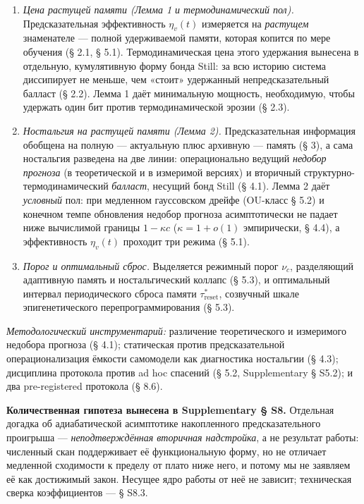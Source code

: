 \documentclass[pdflatex,sn-mathphys-ay]{sn-jnl}
\begin{document}
\begin{enumerate}

\def\labelenumi{\arabic{enumi}.}

\item

  \emph{Цена растущей памяти (Лемма 1 и термодинамический пол).} Предсказательная эффективность \(\eta_v(t)\) измеряется на \emph{растущем} знаменателе --- полной удерживаемой памяти, которая копится по мере обучения (§ 2.1, § 5.1). Термодинамическая цена этого удержания вынесена в отдельную, кумулятивную форму бонда Still: за всю историю система диссипирует не меньше, чем «стоит» удержанный непредсказательный балласт (§ 2.2). Лемма 1 даёт минимальную мощность, необходимую, чтобы удержать один бит против термодинамической эрозии (§ 2.3).

\item

  \emph{Ностальгия на растущей памяти (Лемма 2).} Предсказательная информация обобщена на полную --- актуальную плюс архивную --- память (§ 3), а сама ностальгия разведена на две линии: операционально ведущий \emph{недобор прогноза} (в теоретической и в измеримой версиях) и вторичный структурно-термодинамический \emph{балласт}, несущий бонд Still (§ 4.1). Лемма 2 даёт \emph{условный} пол: при медленном гауссовском дрейфе (OU-класс § 5.2) и конечном темпе обновления недобор прогноза асимптотически не падает ниже вычислимой границы \(1 - \kappa c\) (\(\kappa = 1 + o(1)\) эмпирически, § 4.4), а эффективность \(\eta_v(t)\) проходит три режима (§ 5.1).

\item

  \emph{Порог и оптимальный сброс.} Выделяется режимный порог \(\nu_c\), разделяющий адаптивную память и ностальгический коллапс (§ 5.3), и оптимальный интервал периодического сброса памяти \(\tau_{\text{reset}}^*\), созвучный шкале эпигенетического перепрограммирования (§ 5.3).

\end{enumerate}



\emph{Методологический инструментарий:} различение теоретического и измеримого недобора прогноза (§ 4.1); статическая против предсказательной операционализация ёмкости самомодели как диагностика ностальгии (§ 4.3); дисциплина протокола против ad hoc спасений (§ 5.2, Supplementary § S5.2); и два pre-registered протокола (§ 8.6).



\textbf{Количественная гипотеза вынесена в Supplementary § S8.} Отдельная догадка об адиабатической асимптотике накопленного предсказательного проигрыша --- \emph{неподтверждённая вторичная надстройка}, а не результат работы: численный скан поддерживает её функциональную форму, но не отличает медленной сходимости к пределу от плато ниже него, и потому мы не заявляем её как достижимый закон. Несущее ядро работы от неё не зависит; техническая сверка коэффициентов --- § S8.3.
\end{document}
